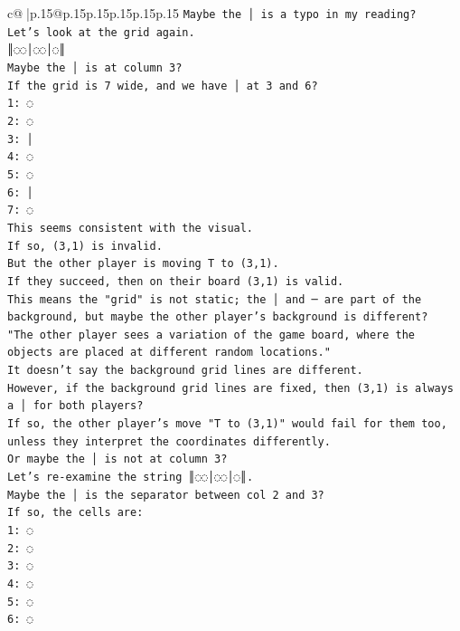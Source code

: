 \documentclass{article}
\begin{document}
{\begin{supertabular}{c@{$\;$}|p{.15\linewidth}@{}p{.15\linewidth}p{.15\linewidth}p{.15\linewidth}p{.15\linewidth}p{.15\linewidth}}
{{{\texttt{Maybe the │ is a typo in my reading?} \\
\texttt{Let's look at the grid again.} \\
\texttt{║◌◌│◌◌│◌║} \\
\texttt{Maybe the │ is at column 3?} \\
\texttt{If the grid is 7 wide, and we have │ at 3 and 6?} \\
\texttt{1: ◌} \\
\texttt{2: ◌} \\
\texttt{3: │} \\
\texttt{4: ◌} \\
\texttt{5: ◌} \\
\texttt{6: │} \\
\texttt{7: ◌} \\
\texttt{This seems consistent with the visual.} \\
\texttt{If so, (3,1) is invalid.} \\
\texttt{But the other player is moving T to (3,1).} \\
\texttt{If they succeed, then on their board (3,1) is valid.} \\
\texttt{This means the "grid" is not static; the │ and ─ are part of the background, but maybe the other player's background is different?} \\
\texttt{"The other player sees a variation of the game board, where the objects are placed at different random locations."} \\
\texttt{It doesn't say the background grid lines are different.} \\
\texttt{However, if the background grid lines are fixed, then (3,1) is always a │ for both players?} \\
\texttt{If so, the other player's move "T to (3,1)" would fail for them too, unless they interpret the coordinates differently.} \\
\texttt{Or maybe the │ is not at column 3?} \\
\texttt{Let's re{-}examine the string ║◌◌│◌◌│◌║.} \\
\texttt{Maybe the │ is the separator between col 2 and 3?} \\
\texttt{If so, the cells are:} \\
\texttt{1: ◌} \\
\texttt{2: ◌} \\
\texttt{3: ◌} \\
\texttt{4: ◌} \\
\texttt{5: ◌} \\
\texttt{6: ◌} \\
}}}
\end{supertabular}}
\end{document}

